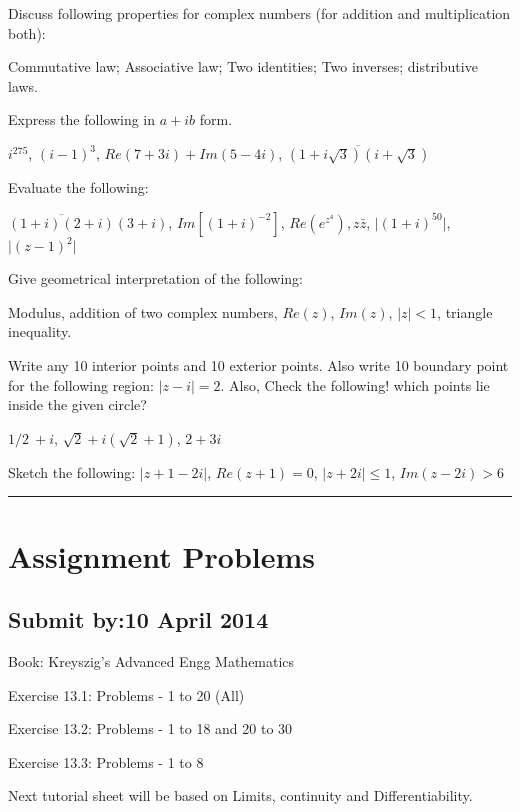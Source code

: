 \documentclass[11pt,addpoints,answers]{exam}
\begin{document}
\begin{questions}
\question 
Discuss following properties for complex numbers (for addition and multiplication
both):

  Commutative
law; Associative law; Two identities; Two inverses; distributive laws.

\question
Express the following in $a+ib$ form.

 $i^{275}$, $(i-1)^3$, $Re(7+3i) + Im(5-4i)$, $\overline{(1+i\sqrt{3})(i+\sqrt{3})}$

\question
Evaluate the following:

$\overline{(1+i)(2+i)}(3+i)$, $Im[(1+i)^{-2}]$, $Re(e^{z^4}), z\bar{z}$, $\vert
(1+i)^{50}\vert$, $\vert (z-1)^2\vert$

\question
Give geometrical interpretation of the following:

Modulus, addition of two complex numbers, $Re(z)$, $Im(z)$, $|z|<1$, triangle
inequality.

\question
Write any 10 interior points and 10 exterior points. Also write 10 boundary
point for the following region: $\vert z-i\vert=2$.
Also, Check the following!  which points lie inside the given circle?

$1/2 ~+i$, $\sqrt{2}+i(\sqrt{2}+1)$, $2+3i$

\question
Sketch the following:
$\vert z+1-2i\vert$, $Re(z+1)=0$, $\vert z+2i \vert \leq 1$, $Im(z-2i)>6$

\hrule
\section*{Assignment Problems}
\subsection*{Submit by:10 April 2014}
Book: Kreyszig's Advanced Engg Mathematics

Exercise 13.1: Problems - 1 to 20 (All)

Exercise 13.2: Problems - 1 to 18 and 20 to 30

Exercise 13.3: Problems - 1 to 8 
\end{questions}
\begin{note}
Next tutorial sheet will be based on Limits, continuity and Differentiability.
\end{note}
\end{document}
